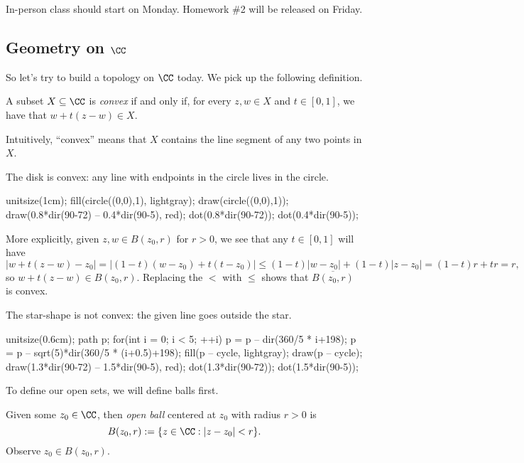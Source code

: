 
In-person class should start on Monday. Homework \#2 will be released on Friday.

\subsection{Geometry on \texorpdfstring{$\CC$}{C}}
So let's try to build a topology on $\CC$ today. We pick up the following definition.
\begin{definition}[Convex]
	A subset $X\subseteq\CC$ is \textit{convex} if and only if, for every $z,w\in X$ and $t\in[0,1]$, we have that $w+t(z-w)\in X$.
\end{definition}
Intuitively, ``convex'' means that $X$ contains the line segment of any two points in $X$.
\begin{example} \label{ex:convexball}
	The disk is convex: any line with endpoints in the circle lives in the circle.
	\begin{center}
		\begin{asy}
			unitsize(1cm);
			fill(circle((0,0),1), lightgray);
			draw(circle((0,0),1));
			draw(0.8*dir(90-72) -- 0.4*dir(90-5), red);
			dot(0.8*dir(90-72));
			dot(0.4*dir(90-5));
		\end{asy}
	\end{center}
	More explicitly, given $z,w\in B(z_0,r)$ for $r>0$, we see that any $t\in[0,1]$ will have
	\[|w+t(z-w)-z_0|=|(1-t)(w-z_0)+t(t-z_0)|\le(1-t)|w-z_0|+(1-t)|z-z_0|=(1-t)r+tr=r,\]
	so $w+t(z-w)\in B(z_0,r)$. Replacing the $<$ with $\le$ shows that $\overline{B(z_0,r)}$ is convex.
\end{example}
\begin{nex}
	The star-shape is not convex: the given line goes outside the star.
	\begin{center}
		\begin{asy}
			unitsize(0.6cm);
			path p;
			for(int i = 0; i < 5; ++i)
			{
				p = p -- dir(360/5 * i+198);
				p = p -- sqrt(5)*dir(360/5 * (i+0.5)+198);
			}
			fill(p -- cycle, lightgray);
			draw(p -- cycle);
			draw(1.3*dir(90-72) -- 1.5*dir(90-5), red);
			dot(1.3*dir(90-72));
			dot(1.5*dir(90-5));
		\end{asy}
	\end{center}
\end{nex}
To define our open sets, we will define balls first.
\begin{definition}
	Given some $z_0\in\CC$, then \textit{open ball} centered at $z_0$ with radius $r>0$ is
	\[B(z_0,r):=\{z\in\CC:|z-z_0|<r\}.\]
	Observe $z_0\in B(z_0,r)$.
\end{definition}
